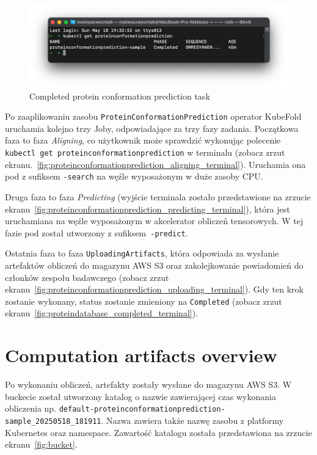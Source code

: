 \begin{figure}[htbp]
    \centering
    \includegraphics[width=\textwidth]{images/proteinconformationprediction_completed_terminal}
    \caption{Completed protein conformation prediction task}
    \label{fig:proteinconformationprediction_completed_terminal}
\end{figure}

Po zaaplikowaniu zasobu \texttt{ProteinConformationPrediction} operator KubeFold uruchamia kolejno trzy Joby, odpowiadające za trzy fazy zadania.
Początkowa faza to faza \textit{Aligning}, co użytkownik może sprawdzić wykonując polecenie \texttt{kubectl get proteinconformationprediction} w terminalu (zobacz zrzut ekranu.~\ref{fig:proteinconformationprediction_aligning_terminal}). Uruchamia ona pod z sufiksem \texttt{-search} na węźle wyposażonym w duże zasoby CPU.

Druga faza to faza \textit{Predicting} (wyjście terminala zostało przedstawione na zrzucie ekranu~\ref{fig:proteinconformationprediction_predicting_terminal}), która jest uruchamiana na węźle wyposażonym w akcelerator obliczeń tensorowych.
W tej fazie pod został utworzony z sufiksem~\texttt{-predict}.

Ostatnia faza to faza \texttt{UploadingArtifacts}, która odpowiada za wysłanie artefaktów obliczeń do magazynu AWS S3 oraz zakolejkowanie powiadomień do członków zespołu badawczego (zobacz zrzut ekranu~\ref{fig:proteinconformationprediction_uploading_terminal}). Gdy ten krok zostanie wykonany, status zostanie zmieniony na \texttt{Completed} (zobacz zrzut ekranu~\ref{fig:proteindatabase_completed_terminal}).

\section{Computation artifacts overview}

Po wykonaniu obliczeń, artefakty zostały wysłane do magazynu AWS S3. W buckecie został utworzony katalog o nazwie zawierającej czas wykonania obliczenia np. \texttt{default-proteinconformationprediction-sample\_20250518\_181911}.
Nazwa zawiera także nazwę zasobu z platformy Kubernetes oraz namespace.
Zawartość katalogu została przedstawiona na zrzucie ekranu~\ref{fig:bucket}.

